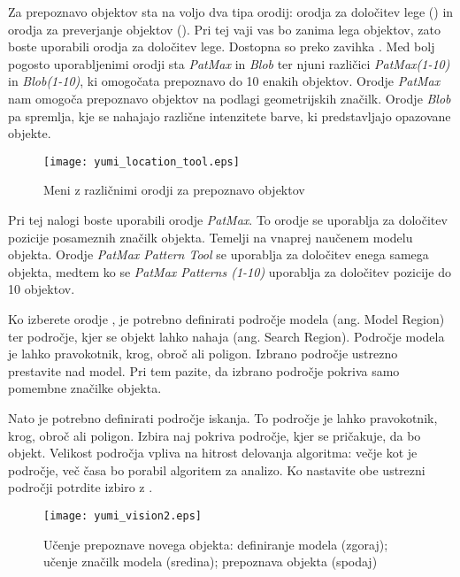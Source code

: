 Za prepoznavo objektov sta na voljo dva tipa orodij: orodja za določitev lege () in orodja za preverjanje objektov (). Pri tej vaji vas bo zanima lega objektov, zato boste uporabili orodja za določitev lege. Dostopna so preko zavihka . Med bolj pogosto uporabljenimi orodji sta {\emph{PatMax}} in {\emph{Blob}} ter njuni različici {\emph{PatMax(1-10)}} in {\emph{Blob(1-10)}}, ki omogočata prepoznavo do 10 enakih objektov. Orodje {\emph{PatMax}} nam omogoča prepoznavo objektov na podlagi geometrijskih značilk. Orodje {\emph{Blob}} pa spremlja, kje se nahajajo različne intenzitete barve, ki predstavljajo opazovane objekte.

\begin{figure}[!hbt]
	\centering
	\texttt{[image: yumi\_location\_tool.eps]}
	\caption{Meni z različnimi orodji za prepoznavo objektov}
	\label{fig:yumi_location_tool}
\end{figure}

Pri tej nalogi boste uporabili orodje {\emph{PatMax}}. To orodje se uporablja za določitev pozicije posameznih značilk objekta. Temelji na vnaprej naučenem modelu objekta. Orodje {\emph{PatMax Pattern Tool}} se uporablja za določitev enega samega objekta, medtem ko se {\emph{PatMax Patterns (1-10)}} uporablja za določitev pozicije do 10 objektov.

Ko izberete orodje , je potrebno definirati področje modela (ang. Model Region) ter področje, kjer se objekt lahko nahaja (ang. Search Region). Področje modela je lahko pravokotnik, krog, obroč ali poligon. Izbrano področje ustrezno prestavite nad model. Pri tem pazite, da izbrano področje pokriva samo pomembne značilke objekta.

Nato je potrebno definirati področje iskanja. To področje je lahko pravokotnik, krog, obroč ali poligon. Izbira naj pokriva področje, kjer se pričakuje, da bo objekt. Velikost področja vpliva na hitrost delovanja algoritma: večje kot je področje, več časa bo porabil algoritem za analizo. Ko nastavite obe ustrezni področji potrdite izbiro z .

\begin{figure}[!hbt]
	\centering
	\texttt{[image: yumi\_vision2.eps]}
	\caption{Učenje prepoznave novega objekta: definiranje modela (zgoraj); učenje značilk modela (sredina); prepoznava objekta (spodaj)}
	\label{fig:yumi_vision}
\end{figure}

